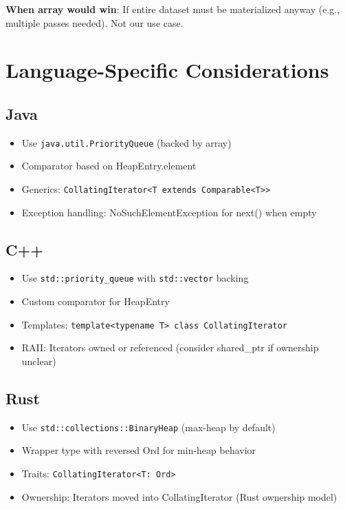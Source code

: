\documentclass[11pt]{article}
\begin{document}
\textbf{When array would win}: If entire dataset must be materialized anyway (e.g., multiple passes needed). Not our use case.

\section{Language-Specific Considerations}

\subsection{Java}

\begin{itemize}
    \item Use \texttt{java.util.PriorityQueue} (backed by array)
    \item Comparator based on HeapEntry.element
    \item Generics: \texttt{CollatingIterator<T extends Comparable<T>>}
    \item Exception handling: NoSuchElementException for next() when empty
\end{itemize}

\subsection{C++}

\begin{itemize}
    \item Use \texttt{std::priority\_queue} with \texttt{std::vector} backing
    \item Custom comparator for HeapEntry
    \item Templates: \texttt{template<typename T> class CollatingIterator}
    \item RAII: Iterators owned or referenced (consider shared\_ptr if ownership unclear)
\end{itemize}

\subsection{Rust}

\begin{itemize}
    \item Use \texttt{std::collections::BinaryHeap} (max-heap by default)
    \item Wrapper type with reversed Ord for min-heap behavior
    \item Traits: \texttt{CollatingIterator<T: Ord>}
    \item Ownership: Iterators moved into CollatingIterator (Rust ownership model)
\end{itemize}
\end{document}
